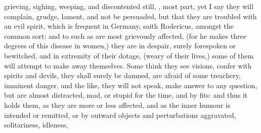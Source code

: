 {grieving, sighing, weeping, and discontented still, ,
most part, yet I say they will complain, grudge, lament, and not be persuaded,
but that they are troubled with an evil spirit, which is frequent in Germany,
saith Rodericus, amongst the common sort: and to such as are most grievously
affected, (for he makes three degrees of this disease in women,) they are in
despair, surely forespoken or bewitched, and in extremity of their dotage,
(weary of their lives,) some of them will attempt to make away themselves. Some
think they see visions, confer with spirits and devils, they shall surely be
damned, are afraid of some treachery, imminent danger, and the like, they will
not speak, make answer to any question, but are almost distracted, mad, or
stupid for the time, and by fits: and thus it holds them, as they are more or
less affected, and as the inner humour is intended or remitted, or by outward
objects and perturbations aggravated, solitariness, idleness, \etc{}

}
